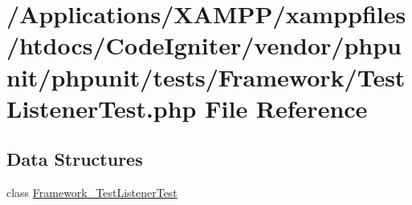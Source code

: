 \hypertarget{_test_listener_test_8php}{}\section{/\+Applications/\+X\+A\+M\+P\+P/xamppfiles/htdocs/\+Code\+Igniter/vendor/phpunit/phpunit/tests/\+Framework/\+Test\+Listener\+Test.php File Reference}
\label{_test_listener_test_8php}
\subsection*{Data Structures}
\begin{DoxyCompactItemize}
\item 
class \mbox{\hyperlink{class_framework___test_listener_test}{Framework\+\_\+\+Test\+Listener\+Test}}
\end{DoxyCompactItemize}
